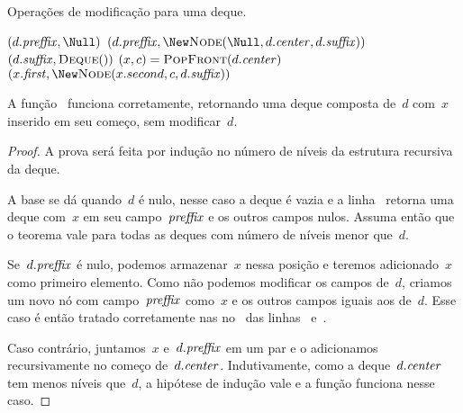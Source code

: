 \documentclass[../../main.tex]{subfiles}
\begin{document}
\begin{algorithm}
\caption{Operações de modificação para uma deque.} \label{lst:deque_mod}
\begin{algorithmic}[1]

        \State \Return \New {} \label{line:dm:puf1}
     \label{line:dm:puf2}
        \State \Return \New {}\label{line:dm:puf2_1}
    \Else
        \State \Return \New {} \label{line:dm:puf3}
    \EndIf
\EndFunction

     \label{line:dm:pof0}
        \State \Return $(d.\V{preffix}, \Null)$
     \label{line:dm:pof1}
        \State \Return $(d.\V{preffix}, \New \Call{Node}{\Null, d.\V{center}, d.\V{suffix}})$ \label{line:dm:pof1_2}
        \State \Return $(d.\V{suffix}, \Call{Deque}{\null})$ \label{line:dm:pof2}
    \Else
        \State $(x, c) = \Call{PopFront}{d.\V{center}}$
        \State \Return $(x.\V{first}, \New \Call{Node}{x.second, c, d.\V{suffix}})$ \label{line:dm:pof3}
    \EndIf
\EndFunction

\end{algorithmic}
\end{algorithm}

\begin{proposition}
A função~ funciona corretamente, retornando uma deque composta de~$d$ com~$x$ inserido em seu começo, sem modificar~$d$.
\end{proposition}

\begin{proof}
A prova será feita por indução no número de níveis da estrutura recursiva da deque.

A base se dá quando~$d$ é nulo, nesse caso a deque é vazia e a linha~ retorna uma deque com~$x$ em seu campo~$\mathit{preffix}$ e os outros campos nulos. Assuma então que o teorema vale para todas as deques com número de níveis menor que~$d$.

Se~$d.\mathit{preffix}$ é nulo, podemos armazenar~$x$ nessa posição e teremos adicionado~$x$ como primeiro elemento. Como não podemos modificar os campos de~$d$, criamos um novo nó com campo~$\mathit{preffix}$ como~$x$ e os outros campos iguais aos de~$d$. Esse caso é então tratado corretamente nas no~ das linhas~ e~.

Caso contrário, juntamos~$x$ e~$d.\mathit{preffix}$ em um par e o adicionamos recursivamente no começo de~$d.\mathit{center}$. Indutivamente, como a deque~$d.\mathit{center}$ tem menos níveis que~$d$, a hipótese de indução vale e a função funciona nesse caso.
\end{proof}
\end{document}
